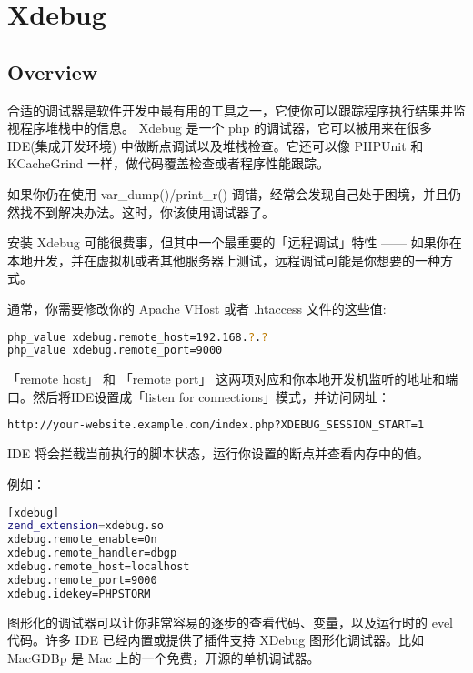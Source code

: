 \part{Xdebug}


\chapter{Overview}

合适的调试器是软件开发中最有用的工具之一，它使你可以跟踪程序执行结果并监视程序堆栈中的信息。 Xdebug 是一个 php 的调试器，它可以被用来在很多 IDE(集成开发环境) 中做断点调试以及堆栈检查。它还可以像 PHPUnit 和 KCacheGrind 一样，做代码覆盖检查或者程序性能跟踪。

如果你仍在使用 var\_dump()/print\_r() 调错，经常会发现自己处于困境，并且仍然找不到解决办法。这时，你该使用调试器了。

安装 Xdebug 可能很费事，但其中一个最重要的「远程调试」特性 —— 如果你在本地开发，并在虚拟机或者其他服务器上测试，远程调试可能是你想要的一种方式。

通常，你需要修改你的 Apache VHost 或者 .htaccess 文件的这些值:

\begin{lstlisting}[language=bash]
php_value xdebug.remote_host=192.168.?.?
php_value xdebug.remote_port=9000
\end{lstlisting}



「remote host」 和 「remote port」 这两项对应和你本地开发机监听的地址和端口。然后将IDE设置成「listen for connections」模式，并访问网址：


\begin{lstlisting}[language=bash]
http://your-website.example.com/index.php?XDEBUG_SESSION_START=1
\end{lstlisting}



IDE 将会拦截当前执行的脚本状态，运行你设置的断点并查看内存中的值。

例如：

\begin{lstlisting}[language=bash]
[xdebug]
zend_extension=xdebug.so
xdebug.remote_enable=On
xdebug.remote_handler=dbgp
xdebug.remote_host=localhost
xdebug.remote_port=9000
xdebug.idekey=PHPSTORM
\end{lstlisting}


图形化的调试器可以让你非常容易的逐步的查看代码、变量，以及运行时的 evel 代码。许多 IDE 已经内置或提供了插件支持 XDebug 图形化调试器。比如 MacGDBp 是 Mac 上的一个免费，开源的单机调试器。